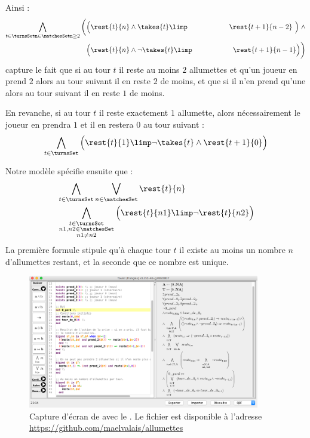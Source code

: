 Ainsi :
\begin{align}
\bigwedge_{\substack{t \in \turnsSet%
n \in \matchesSet%
n \geq 2}}
    \bigg ( & \Big ( \rest{t}{n} \land \takes{t} \limp%
    & \hspace{1.5cm}\rest{t+1}{n-2} \ \Big ) \; \land \\
    & \Big ( \rest{t}{n} \land \neg \takes{t} \limp %
    & \hspace{1.5cm}\rest{t+1}{n-1} \Big ) \bigg )
\end{align}
capture le fait que si au tour $t$ il reste au moins $2$ allumettes et qu'un joueur en prend $2$ alors au tour suivant il en reste $2$ de moins, et que si il n'en prend qu'une alors au tour suivant il en reste $1$ de moins.

En revanche, si au tour $t$ il reste exactement $1$ allumette, alors nécessairement le joueur en prendra $1$ et il en restera $0$ au tour suivant :
\begin{gather}
\bigwedge_{t \in \turnsSet}
    \Big (\rest{t}{1} \limp \neg \takes{t} \land \rest{t+1}{0}\Big )
\end{gather}

Notre modèle spécifie ensuite que :
\begin{align}
& \bigwedge_{t \in \turnsSet}
    \bigvee_{n \in \matchesSet}
        \rest{t}{n} \\
& \bigwedge_{\substack{t \in \turnsSet\\ n1, n2 \in \matchesSet\\ n1 \neq n2}}
    \Big ( \rest{t}{n1} \limp \neg\rest{t}{n2} \Big )
\end{align}
La première formule stipule qu'à chaque tour $t$ il existe au moins un nombre $n$ d'allumettes restant, et la seconde que ce nombre est unique.

\begin{figure}
\centering
\includegraphics[width=0.9\textwidth]{Pictures/touistScreenshot}
\caption{Capture d'écran de \touist avec le \game. Le fichier est disponible à l'adresse \url{https://github.com/maelvalais/allumettes}}
\label{fig:touistScreenshot}
\end{figure}

